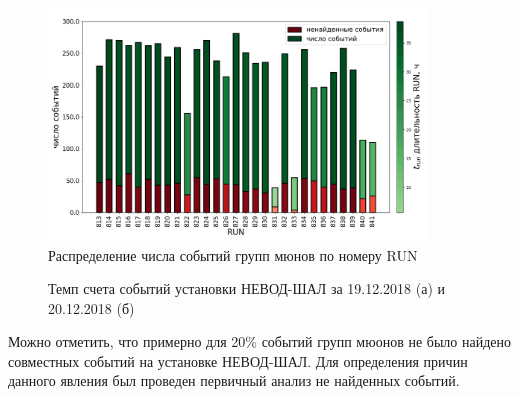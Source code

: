 \begin{figure}[ht]
    \centering
    \includegraphics[width=0.9\textwidth]{images/muon_group_by_run.png}
    \caption{Распределение числа событий групп мюнов по номеру RUN}
    \label{fig:muon_group_by_run}
\end{figure}


\begin{figure}[h]
    \centering


    \caption{Темп счета событий установки НЕВОД-ШАЛ за 19.12.2018 (а) и 20.12.2018 (б)}
    \label{fig:muon_example}
\end{figure}
Можно отметить, что примерно для 20\% событий групп мюонов не было найдено совместных событий на установке НЕВОД-ШАЛ. Для определения причин данного явления был проведен первичный анализ не найденных событий. 

